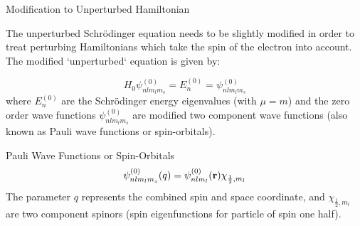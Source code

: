 \documentclass[aspectratio=1610,xcolor=dvipsnames,t]{beamer}
\begin{document}

    \begin{frame}{Modification to Unperturbed Hamiltonian} 
    
    The unperturbed Schr\"odinger 
    equation needs to be slightly modified in order to treat perturbing Hamiltonians
    which take the spin of the electron into account. The modified `unperturbed`
    equation is given by:

    \begin{equation}
        H_0 \psi_{nlm_l m_s }^{(0)} = E_{n}^{(0)} = \psi_{nlm_l m_s}^{(0)} 
    \end{equation}
    where $E_{n}^{(0)}$ are the Schr\"odinger energy eigenvalues (with $\mu = m$) and 
    the zero order wave functions $\psi_{nlm_l m_s}^{(0)}$ are modified two component
    wave functions (also known as Pauli wave functions or spin-orbitals).
    \end{frame} 

    \begin{frame}{Pauli Wave Functions or Spin-Orbitals}  
    \begin{equation}
        \psi_{nlm_l m_s}^{(0)}(q) = \psi_{nlm_l}^{(0)}({\bf r}) \chi_{\frac{1}{2},m_l}
    \end{equation}
    The parameter $q$ represents the combined spin and space coordinate, and 
    $\chi_{\frac{1}{2},m_l}$ are two component spinors (spin eigenfunctions for
    particle of spin one half). 
    \end{frame} 
   
\end{document}
